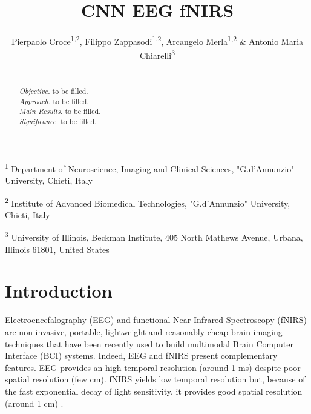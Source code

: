 \documentclass[12pt ]{iopart}
\begin{document}
\title[CNN EEG fNIRS]{CNN EEG fNIRS}

\author{Pierpaolo Croce\textsuperscript{1,2}, Filippo Zappasodi\textsuperscript{1,2}, Arcangelo Merla\textsuperscript{1,2} \& Antonio Maria Chiarelli\textsuperscript{3}}

\vspace{10pt}
\begin{indented}
\item[] \textsuperscript{1} Department of Neuroscience, Imaging and Clinical Sciences, "G.d’Annunzio" University, Chieti, Italy
\item[] \textsuperscript{2} Institute of Advanced Biomedical Technologies, "G.d’Annunzio" University, Chieti, Italy
\item[] \textsuperscript{3} University of Illinois, Beckman Institute, 405 North Mathews Avenue, Urbana, Illinois 61801, United States
\end{indented}

\begin{abstract}
	\\
	\textit{Objective.} to be filled. \\
	\textit{Approach.} to be filled.\\
	\textit{Main Results.} to be filled. \\
	\textit{Significance.} to be filled.
\end{abstract}


\section{Introduction}

Electroencefalography (EEG) and functional Near-Infrared Spectroscopy (fNIRS) are non-invasive, portable, lightweight and reasonably cheap brain imaging techniques that have been recently used to build multimodal Brain Computer Interface (BCI) systems. Indeed, EEG and fNIRS present complementary features. EEG provides an high temporal resolution (around 1 ms) despite poor spatial resolution (few cm). fNIRS yields low temporal resolution but, because of the fast exponential decay of light sensitivity, it provides good spatial resolution (around 1 cm) \parencite{chiarelli2016combining}. 
\end{document}
